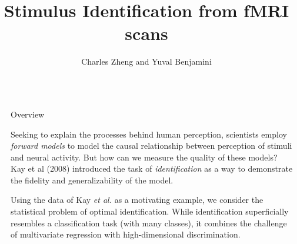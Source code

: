 \documentclass[final]{beamer}
\title{Stimulus Identification from fMRI scans}
\author{Charles Zheng and Yuval Benjamini} %
\institute{Stanford University, Department of Statistics} %
\newlength{\sepwid}
\newlength{\onecolwid}
\begin{document}

\setlength{\belowcaptionskip}{2ex} %
\setlength\belowdisplayshortskip{2ex} %

\begin{frame}[t] %

\begin{columns}[t] %

\begin{column}{\sepwid}\end{column} %

\begin{column}{\onecolwid} %



\begin{alertblock}{Overview}
\vspace{0.3in}

Seeking to explain the processes behind human perception, scientists
employ \emph{forward models} to model the causal relationship between
perception of stimuli and neural activity.  But how can we measure the quality of
these models?  Kay et al (2008) introduced the
task of \emph{identification} as a way to demonstrate the fidelity and
generalizability of the model.
\vspace{0.6in}

Using the data of Kay \emph{et al.} as a motivating example, we
consider the statistical problem of optimal identification.  While
identification superficially resembles a classification task (with
many classes), it combines the challenge of multivariate regression
with high-dimensional discrimination.
\end{alertblock}


\end{column}
\end{columns}
\end{frame}
\end{document}
